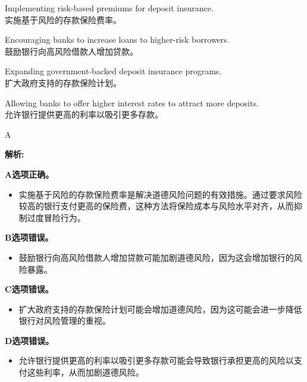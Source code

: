 \documentclass{article}
\newenvironment{explanation}
{\textbf{解析:}\par}
{\par}
\begin{document}
        \begin{choices}
            \item Implementing risk-based premiums for deposit insurance.\\实施基于风险的存款保险费率。
            \item Encouraging banks to increase loans to higher-risk borrowers.\\鼓励银行向高风险借款人增加贷款。
            \item Expanding government-backed deposit insurance programs.\\扩大政府支持的存款保险计划。
            \item Allowing banks to offer higher interest rates to attract more deposits.\\允许银行提供更高的利率以吸引更多存款。
        \end{choices}
        
        \begin{correctanswer}
        A
        \end{correctanswer}
        
        \begin{explanation}

        \textbf{A选项正确。}
        \begin{itemize}
        \item 实施基于风险的存款保险费率是解决道德风险问题的有效措施。通过要求风险较高的银行支付更高的保险费，这种方法将保险成本与风险水平对齐，从而抑制过度冒险行为。
        \end{itemize}

        \textbf{B选项错误。}
        \begin{itemize}
        \item 鼓励银行向高风险借款人增加贷款可能加剧道德风险，因为这会增加银行的风险暴露。
        \end{itemize}

        \textbf{C选项错误。}
        \begin{itemize}
        \item 扩大政府支持的存款保险计划可能会增加道德风险，因为这可能会进一步降低银行对风险管理的重视。
        \end{itemize}

        \textbf{D选项错误。}
        \begin{itemize}
        \item 允许银行提供更高的利率以吸引更多存款可能会导致银行承担更高的风险以支付这些利率，从而加剧道德风险。
        \end{itemize}
        \end{explanation}
\end{document}
